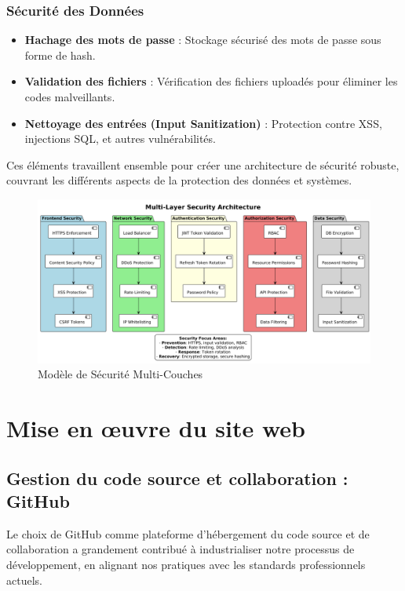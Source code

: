 \documentclass{rapportPfe}
\begin{document}
\subsection*{Sécurité des Données}
\begin{itemize}

  \item \textbf{Hachage des mots de passe} : Stockage sécurisé des mots de passe sous forme de hash.
  \item \textbf{Validation des fichiers} : Vérification des fichiers uploadés pour éliminer les codes malveillants.
  \item \textbf{Nettoyage des entrées (Input Sanitization)} : Protection contre XSS, injections SQL, et autres vulnérabilités.
\end{itemize}

Ces éléments travaillent ensemble pour créer une architecture de sécurité robuste, couvrant les différents aspects de la protection des données et systèmes.


\begin{figure}[htbp]
    \centering
    \includegraphics[width=1.1\textwidth]{diagrams/diagram6.png}
    \caption{Modèle de Sécurité Multi-Couches}
    \label{fig:diagram6}
\end{figure}



\newpage

\chapter{Mise en œuvre du site web}

\section{Gestion du code source et collaboration : GitHub}

Le choix de GitHub comme plateforme d’hébergement du code source et de collaboration a grandement contribué à industrialiser notre processus de développement, en alignant nos pratiques avec les standards professionnels actuels.
\end{document}
